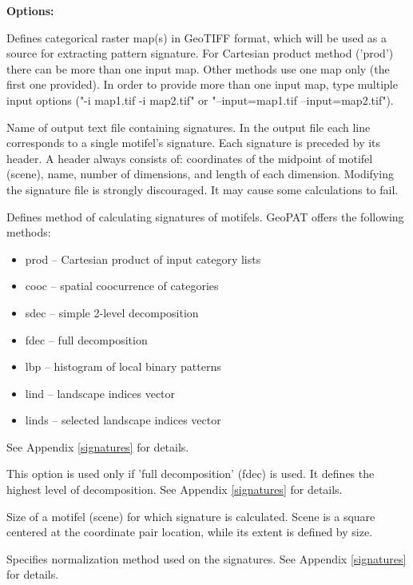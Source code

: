 {\bf Options:}


Defines categorical raster map(s) in GeoTIFF format, which will be used as a source for extracting pattern signature. For Cartesian product method ('prod') there can be more than one input map. Other methods use one map only (the first one provided). In order to provide more than one input map, type multiple input options ("-i map1.tif -i map2.tif" or "--input=map1.tif --input=map2.tif").


Name of output text file containing signatures. In the output file each line corresponds to a single motifel's signature. Each signature is preceded by its header. A header always consists of: coordinates of the midpoint of motifel (scene), name, number of dimensions, and length of each dimension. Modifying the signature file is strongly discouraged. It may cause some calculations to fail.


Defines method of calculating signatures of motifels. GeoPAT offers the following methods: 
\begin{itemize}
	\item prod -- Cartesian product of input category lists
	\item cooc -- spatial coocurrence of categories
	\item sdec -- simple 2-level decomposition
	\item fdec -- full decomposition
	\item lbp -- histogram of local binary patterns
	\item lind -- landscape indices vector
	\item linds -- selected landscape indices vector
\end{itemize}
See Appendix \ref{signatures} for details.


This option is used only if 'full decomposition' (fdec) is used. It defines the highest level of decomposition. See Appendix \ref{signatures} for details.


Size of a motifel (scene) for which signature is calculated. Scene is a square centered at the coordinate pair location, while its extent is defined by size. 


Specifies normalization method used on the signatures. See Appendix \ref{signatures} for details.

